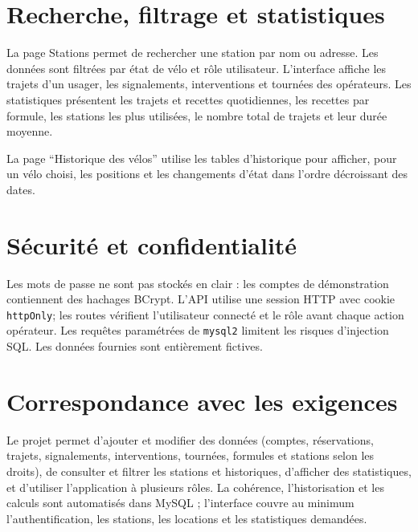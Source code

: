 \documentclass[11pt,a4paper]{article}
\begin{document}
\section{Recherche, filtrage et statistiques}
La page Stations permet de rechercher une station par nom ou adresse. Les données sont filtrées par état de vélo et rôle utilisateur. L'interface affiche les trajets d'un usager, les signalements, interventions et tournées des opérateurs. Les statistiques présentent les trajets et recettes quotidiennes, les recettes par formule, les stations les plus utilisées, le nombre total de trajets et leur durée moyenne.

La page ``Historique des vélos'' utilise les tables d'historique pour afficher, pour un vélo choisi, les positions et les changements d'état dans l'ordre décroissant des dates.

\section{Sécurité et confidentialité}
Les mots de passe ne sont pas stockés en clair : les comptes de démonstration contiennent des hachages BCrypt. L'API utilise une session HTTP avec cookie \texttt{httpOnly}; les routes vérifient l'utilisateur connecté et le rôle avant chaque action opérateur. Les requêtes paramétrées de \texttt{mysql2} limitent les risques d'injection SQL. Les données fournies sont entièrement fictives.

\section{Correspondance avec les exigences}
Le projet permet d'ajouter et modifier des données (comptes, réservations, trajets, signalements, interventions, tournées, formules et stations selon les droits), de consulter et filtrer les stations et historiques, d'afficher des statistiques, et d'utiliser l'application à plusieurs rôles. La cohérence, l'historisation et les calculs sont automatisés dans MySQL ; l'interface couvre au minimum l'authentification, les stations, les locations et les statistiques demandées.
\end{document}
